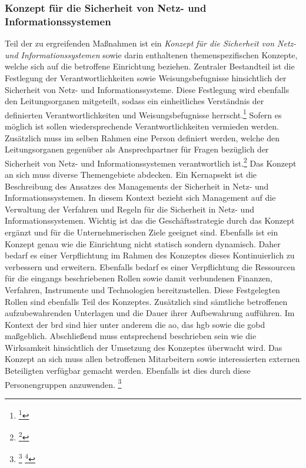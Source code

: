 \documentclass[11pt,a4paper,hidelinks]{article}   %
\begin{document}
            \subsubsection{Konzept für die Sicherheit von Netz- und Informationssystemen}
            Teil der zu ergreifenden Maßnahmen ist ein \emph{Konzept für die Sicherheit von Netz- und Informationssystemen} sowie darin enthaltenen themenspezifischen Konzepte, welche sich auf die betroffene Einrichtung beziehen. Zentraler Bestandteil ist die Festlegung der Verantwortlichkeiten sowie Weisungsbefugnisse hinsichtlich der Sicherheit von Netz- und Informationssysteme. Diese Festlegung wird ebenfalls den Leitungsorganen mitgeteilt, sodass ein einheitliches Verständnis der definierten Verantwortlichkeiten und Weisungsbefugnisse herrscht.\footnote{\footcite[Vgl.][, Anhang, Nummer 1.2.1. \& 1.2.4.]{EU2024-2690}} Sofern es möglich ist sollen wiedersprechende Verantwortlichkeiten vermieden werden. Zusätzlich muss im selben Rahmen eine Person definiert werden, welche den Leitungsorganen gegenüber als Ansprechpartner für Fragen bezüglich der Sicherheit von Netz- und Informationssystemen verantwortlich ist.\footnote{\footcite[Vgl.][, Anhang, Nummer 1.2.3.]{EU2024-2690}} Das Konzept an sich muss diverse Themengebiete abdecken. Ein Kernapsekt ist die Beschreibung des Ansatzes des Managements der Sicherheit in Netz- und Informationssystemen. In diesem Kontext bezieht sich Management auf die Verwaltung der Verfahren und Regeln für die Sicherheit in Netz- und Informationssystemen. Wichtig ist das die Geschäftsstrategie durch das Konzept ergänzt und für die Unternehmerischen Ziele geeignet sind. Ebenfalls ist ein Konzept genau wie die Einrichtung nicht statisch sondern dynamisch. Daher bedarf es einer Verpflichtung im Rahmen des Konzeptes dieses Kontinuierlich zu verbessern und erweitern. Ebenfalls bedarf es einer Verpflichtung die Ressourcen für die eingangs beschriebenen Rollen sowie damit verbundenen Finanzen, Verfahren, Instrumente und Technologien bereitzustellen. Diese Festgelegten Rollen sind ebenfalls Teil des Konzeptes. Zusätzlich sind sämtliche betroffenen aufzubewahrenden Unterlagen und die Dauer ihrer Aufbewahrung aufführen. Im Kontext der \gls{brd} sind hier unter anderem die \gls{ao}, das \gls{hgb} sowie die \gls{gobd} maßgeblich. Abschließend muss entsprechend beschrieben sein wie die Wirksamkeit hinsichtlich der Umsetzung des Konzeptes überwacht wird. Das Konzept an sich muss allen betroffenen Mitarbeitern sowie interessierten externen Beteiligten verfügbar gemacht werden. Ebenfalls ist dies durch diese Personengruppen anzuwenden. \footnote{
                \footcite[Vgl.][, Anhang, Nummer 1.2.1.]{EU2024-2690}
                \footcite[Vgl. S. 362, 375 - 381][]{10.1146-annurev.psych.50.1.361}
            }
\end{document}
